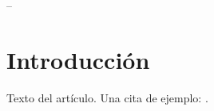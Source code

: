 \documentclass[a4paper,11pt]{article}
\begin{document}
\begin{center}
    {\LARGE\bfseries \eltitulo}

    \vspace{0.8em}
    \elautor \quad -- \quad \lafecha
\end{center}

\vspace{1em}

\begin{abstract}
    Resumen del artículo en un párrafo.
\end{abstract}

\section{Introducción}

Texto del artículo. Una cita de ejemplo: \cite{knuth1984}.

\printbibliography
\end{document}
